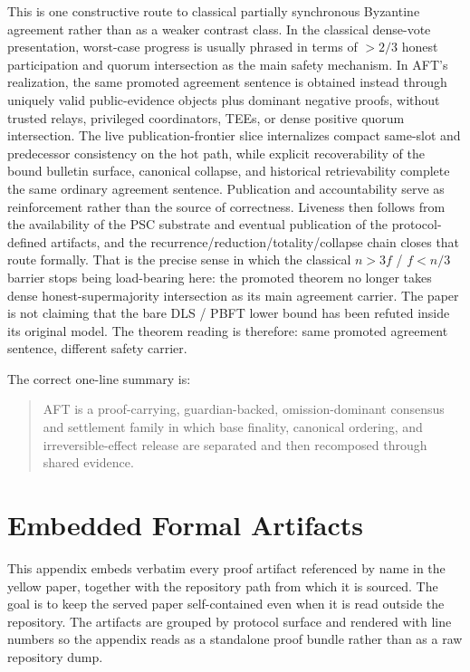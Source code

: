\documentclass[11pt]{article}
\newcommand{\AFT}{\textsc{AFT}}
\begin{document}
This is one constructive route to classical partially
synchronous Byzantine agreement rather than as a weaker contrast class. In the
classical dense-vote presentation, worst-case progress is usually phrased in
terms of \(> 2/3\) honest participation and quorum intersection as the main
safety mechanism. In \AFT{}'s realization, the same promoted agreement sentence is
obtained instead through uniquely valid public-evidence objects plus dominant
negative proofs, without trusted relays, privileged coordinators, TEEs, or
dense positive quorum intersection. The live publication-frontier slice
internalizes compact same-slot and predecessor consistency on the hot path,
while explicit recoverability of the bound bulletin surface, canonical
collapse, and historical retrievability complete the same ordinary agreement
sentence. Publication and accountability serve as reinforcement rather than the
source of correctness. Liveness then follows from the availability of the PSC
substrate and eventual publication of the protocol-defined artifacts, and the
recurrence/reduction/totality/collapse chain closes that route formally.
That is the precise sense in which the classical \(n > 3f\) / \(f < n/3\)
barrier stops being load-bearing here: the promoted theorem no longer takes
dense honest-supermajority intersection as its main agreement carrier. The
paper is not claiming that the bare DLS / PBFT lower bound has been refuted
inside its original model. The theorem reading is therefore: same promoted
agreement sentence, different safety carrier.

The correct one-line summary is:

\begin{quote}
\AFT{} is a proof-carrying, guardian-backed, omission-dominant consensus and
settlement family in which base finality, canonical ordering, and
irreversible-effect release are separated and then recomposed through shared
evidence.
\end{quote}

\appendix

\section{Embedded Formal Artifacts}
\label{appendix:formal-artifacts}

This appendix embeds verbatim every proof artifact referenced by name in the
yellow paper, together with the repository path from which it is sourced. The
goal is to keep the served paper self-contained even when it is read outside
the repository. The artifacts are grouped by protocol surface and rendered
with line numbers so the appendix reads as a standalone proof bundle rather
than as a raw repository dump.
\end{document}

